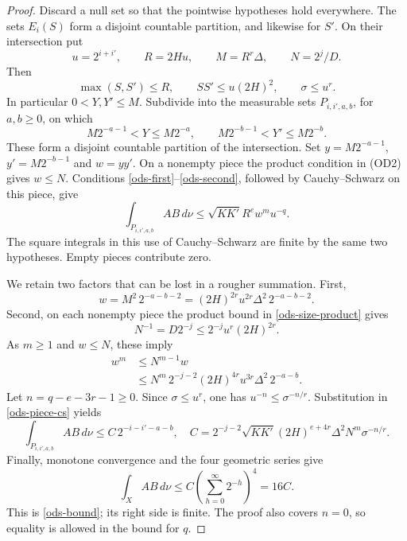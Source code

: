 \begin{proof}
Discard a null set so that the pointwise hypotheses hold everywhere.
The sets $E_i(S)$ form a disjoint countable partition, and likewise
for $S'$. On their intersection put
\[
 u=2^{i+i'},\qquad R=2Hu,\qquad M=R^r\Delta,
 \qquad N=2^j/D.
\]
Then
\begin{equation}\label{ods-size-product}
 \max(S,S')\le R,\qquad SS'\le u(2H)^2,
 \qquad \sigma\le u^r.
\end{equation}
In particular $0<Y,Y'\le M$. Subdivide into the measurable sets
$P_{i,i',a,b}$, for $a,b\ge0$, on which
\[
       M2^{-a-1}<Y\le M2^{-a},\qquad
       M2^{-b-1}<Y'\le M2^{-b}.
\]
These form a disjoint countable partition of the intersection.
Set $y=M2^{-a-1}$, $y'=M2^{-b-1}$ and $w=yy'$.
On a nonempty piece the product condition in (OD2) gives
$w\le N$. Conditions \eqref{ods-first}--\eqref{ods-second},
followed by Cauchy--Schwarz on this piece, give
\begin{equation}\label{ods-piece-cs}
 \int_{P_{i,i',a,b}}AB\,d\nu
 \le \sqrt{KK'}R^e w^m u^{-q}.
\end{equation}
The square integrals in this use of Cauchy--Schwarz are finite by
the same two hypotheses. Empty pieces contribute zero.

We retain two factors that can be lost in a rougher summation.
First,
\[
 w=M^2\,2^{-a-b-2}
     =(2H)^{2r}u^{2r}\Delta^2\,2^{-a-b-2}.
\]
Second, on each nonempty piece the product bound in
\eqref{ods-size-product} gives
\[
                    N^{-1}=D2^{-j}
                          \le2^{-j}u^r(2H)^{2r}.
\]
As $m\ge1$ and $w\le N$, these imply
\begin{equation}\label{ods-power}
 \begin{split}
 w^m&\le N^{m-1}w\\
 &\le N^m\,2^{-j-2}(2H)^{4r}u^{3r}\Delta^2\,2^{-a-b}.
 \end{split}
\end{equation}
Let $n=q-e-3r-1\ge0$. Since $\sigma\le u^r$, one has
$u^{-n}\le\sigma^{-n/r}$. Substitution in
\eqref{ods-piece-cs} yields
\[
 \int_{P_{i,i',a,b}}AB\,d\nu
 \le C\,2^{-i-i'-a-b},
 \quad
 C=2^{-j-2}\sqrt{KK'}(2H)^{e+4r}\Delta^2N^m\sigma^{-n/r}.
\]
Finally, monotone convergence and the four geometric series give
\[
 \int_XAB\,d\nu
 \le C\left(\sum_{h=0}^{\infty}2^{-h}\right)^4=16C.
\]
This is \eqref{ods-bound}; its right side is finite. The proof
also covers $n=0$, so equality is allowed in the bound for $q$.
\end{proof}

